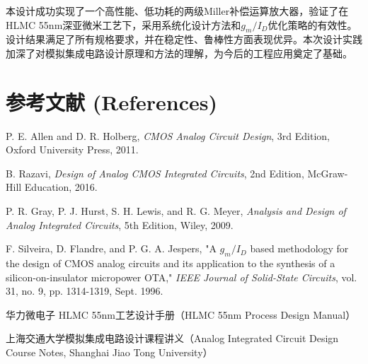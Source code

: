 \documentclass[UTF8,12pt,a4paper]{ctexart}
\begin{document}
本设计成功实现了一个高性能、低功耗的两级Miller补偿运算放大器，验证了在HLMC 55nm深亚微米工艺下，采用系统化设计方法和$g_m/I_D$优化策略的有效性。设计结果满足了所有规格要求，并在稳定性、鲁棒性方面表现优异。本次设计实践加深了对模拟集成电路设计原理和方法的理解，为今后的工程应用奠定了基础。

\section*{参考文献 (References)}

\begin{enumerate}[label={[\arabic*]}]
    \item P. E. Allen and D. R. Holberg, \textit{CMOS Analog Circuit Design}, 3rd Edition, Oxford University Press, 2011.
    
    \item B. Razavi, \textit{Design of Analog CMOS Integrated Circuits}, 2nd Edition, McGraw-Hill Education, 2016.
    
    \item P. R. Gray, P. J. Hurst, S. H. Lewis, and R. G. Meyer, \textit{Analysis and Design of Analog Integrated Circuits}, 5th Edition, Wiley, 2009.
    
    \item F. Silveira, D. Flandre, and P. G. A. Jespers, "A $g_m/I_D$ based methodology for the design of CMOS analog circuits and its application to the synthesis of a silicon-on-insulator micropower OTA," \textit{IEEE Journal of Solid-State Circuits}, vol. 31, no. 9, pp. 1314-1319, Sept. 1996.
    
    \item 华力微电子 HLMC 55nm工艺设计手册（HLMC 55nm Process Design Manual）
    
    \item 上海交通大学模拟集成电路设计课程讲义（Analog Integrated Circuit Design Course Notes, Shanghai Jiao Tong University）
\end{enumerate}
\end{document}
